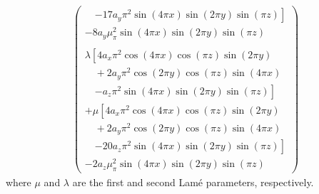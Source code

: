 \documentclass[sn-mathphys,Numbered]{sn-jnl}%
\newcommand{\bb}{\boldsymbol}
\begin{document}
\begin{appendices}
\begin{align}
\begin{pmatrix}
        \quad \left. - 17 a_y \pi^2 \sin(4\pi x) \sin(2\pi y) \sin(\pi z)
    \right] \\
    - 8 a_y \mu_ \pi^2 \sin(4\pi x) \sin(2\pi y) \sin(\pi z) \\
    \\
    \lambda
    \left[
        4 a_x \pi^2 \cos(4\pi x) \cos(\pi z) \sin(2\pi y) \right. \\
        \quad + 2 a_y \pi^2 \cos(2\pi y) \cos(\pi z) \sin(4\pi x) \\
        \quad \left. - a_z \pi^2 \sin(4\pi x) \sin(2\pi y) \sin(\pi z)
    \right] \\
    + \mu
    \left[
        4 a_x \pi^2 \cos(4\pi x) \cos(\pi z) \sin(2\pi y) \right. \\
        \quad + 2 a_y \pi^2 \cos(2\pi y) \cos(\pi z) \sin(4\pi x) \\
        \quad \left. - 20 a_z \pi^2 \sin(4\pi x) \sin(2\pi y) \sin(\pi z)
    \right] \\
    - 2 a_z \mu_ \pi^2 \sin(4\pi x) \sin(2\pi y) \sin(\pi z)
    \end{pmatrix}
\end{align}
where $\mu$ and $\lambda$ are the first and second Lam\'{e} parameters, respectively.



\end{appendices}
\end{document}
